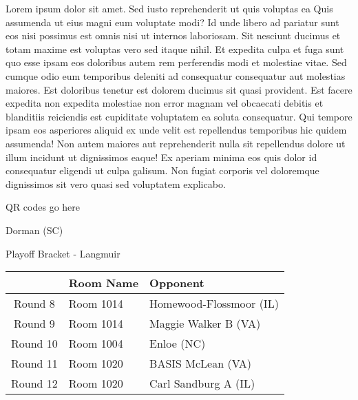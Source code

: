 \documentclass{article}%
\begin{document}
\vspace*{8pt}%
\linebreak%
\newline%
\newline%
Lorem ipsum dolor sit amet. Sed iusto reprehenderit ut quis voluptas ea Quis assumenda ut eius magni eum voluptate modi? Id unde libero ad pariatur sunt eos nisi possimus est omnis nisi ut internos laboriosam. Sit nesciunt ducimus et totam maxime est voluptas vero sed itaque nihil. Et expedita culpa et fuga sunt quo esse ipsam eos doloribus autem rem perferendis modi et molestiae vitae.\newline%
\newline%
Sed cumque odio eum temporibus deleniti ad consequatur consequatur aut molestias maiores. Est doloribus tenetur est dolorem ducimus sit quasi provident. Est facere expedita non expedita molestiae non error magnam vel obcaecati debitis et blanditiis reiciendis est cupiditate voluptatem ea soluta consequatur. Qui tempore ipsam eos asperiores aliquid ex unde velit est repellendus temporibus hic quidem assumenda!\newline%
\newline%
Non autem maiores aut reprehenderit nulla sit repellendus dolore ut illum incidunt ut dignissimos eaque! Ex aperiam minima eos quis dolor id consequatur eligendi ut culpa galisum. Non fugiat corporis vel doloremque dignissimos sit vero quasi sed voluptatem explicabo.\newline%
\newline%
%
\vspace*{30pt}%
\begin{center}%
\begin{Huge}%
QR codes go here%
\end{Huge}%
\end{center}%
\newpage%
\begin{center}%
\begin{Huge}%
Dorman (SC)%
\end{Huge}%
\vspace*{8pt}%
\linebreak%
\begin{Large}%
Playoff Bracket {-} Langmuir%
\end{Large}%
\end{center}%
%
\begin{tabularx}{\textwidth}{|c|Y|Y|}%
\hline%
&Room Name&Opponent\\%
\hline%
Round 8&Room 1014&Homewood{-}Flossmoor (IL)\\%
Round 9&Room 1014&Maggie Walker B (VA)\\%
Round 10&Room 1004&Enloe (NC)\\%
Round 11&Room 1020&BASIS McLean (VA)\\%
Round 12&Room 1020&Carl Sandburg A (IL)\\%
\hline%
\end{tabularx}%
\end{document}
